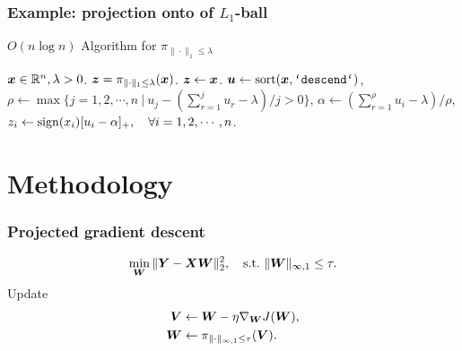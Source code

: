 \documentclass{beamer}
\begin{document}
\begin{frame}[fragile]
    \frametitle{Example: projection onto of $L_1$-ball}
    \begin{algorithm}[H]
        \caption{$O(n\log n)$ Algorithm for $\pi_{\|\cdot\|_1\leq\lambda}$}
        \begin{algorithmic}[1]
            \REQUIRE ${\bm x}\in{\mathbb R}^n,\lambda>0$.
            \ENSURE ${\bm z}=\pi_{\|\cdot\|_1\leq\lambda}({\bm x})$.
            \IF {$\|\x\|_1\leq\lambda$}
                \STATE ${\bm z}\leftarrow{\bm x}$.
            \ELSE
                \STATE $\ubf\leftarrow\mathrm{sort}(\x,\verb+`descend`+)$,
                \STATE $\rho\leftarrow\max\{j=1,2,\cdots,n~|~ u_j-(\sum_{r=1}^ju_r-\lambda)/j>0\}$,
                \STATE $\alpha\leftarrow(\sum_{r=1}^{\rho}u_i-\lambda)/\rho$,
                \STATE $z_i\leftarrow\mathrm{sign}(x_i)[u_i-\alpha]_+,\quad\forall i=1,2,\cdots,n$.
            \ENDIF
        \end{algorithmic}
    \end{algorithm}
\end{frame}


\section{Methodology}

\begin{frame}[fragile]
    \frametitle{Projected gradient descent}
    \begin{align}
        \min_{{\bm W}}\|{\bm Y}-{\bm X}{\bm W}\|_2^2,\quad\mathrm{s.t.}~\|{\bm W}\|_{\infty,1}\leq\tau.
    \end{align}
    Update 
    \begin{align}
        {\bm V}&\leftarrow{\bm W}-\eta\nabla_{{\bm W}}J({\bm W}),\\
        {\bm W}&\leftarrow\pi_{\|\cdot\|_{\infty,1}\leq\tau}({\bm V}).
    \end{align}
\end{frame}
\end{document}
